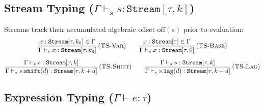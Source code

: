 \documentclass[11pt,a4paper]{article}
\theoremstyle{definition}
\theoremstyle{plain}
\newcommand{\ty}[1]{\texttt{#1}}
\newcommand{\Stream}{\ty{Stream}}
\begin{document}
\subsection{Stream Typing ($\Gamma \vdash_s s : \Stream[\tau, k]$)}

Streams track their accumulated algebraic offset $\text{off}(s)$ prior to evaluation:
\begin{gather}
\frac{x : \Stream[\tau, k_0] \in \Gamma}{\Gamma \vdash_s x : \Stream[\tau, k_0]} \, (\textsc{TS-Var}) \qquad
\frac{x : \Stream[\tau] \in \Gamma}{\Gamma \vdash_s x : \Stream[\tau, 0]} \, (\textsc{TS-Base}) \\[6pt]
\frac{\Gamma \vdash_s s : \Stream[\tau, k]}{\Gamma \vdash_s s.\ty{shift}(d) : \Stream[\tau, k + d]} \, (\textsc{TS-Shift}) \qquad
\frac{\Gamma \vdash_s s : \Stream[\tau, k]}{\Gamma \vdash_s s.\ty{lag}(d) : \Stream[\tau, k - d]} \, (\textsc{TS-Lag})
\end{gather}

\subsection{Expression Typing ($\Gamma \vdash e : \tau$)}
\end{document}
